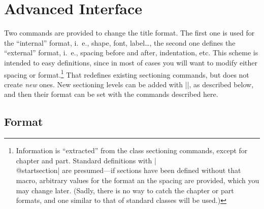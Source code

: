 \documentclass[a4paper]{ltxguide}
\def\gobble#1{}
\def\cs#1{\expandafter\gobble\string\\#1}
\begin{document}
\section{Advanced Interface}

Two commands are provided to change the title format.  The first one
is used for the ``internal'' format, i.~e., shape, font, label\dots,
the second one defines the ``external'' format, i.~e., spacing before
and after, indentation, etc.  This scheme is intended to easy
definitions, since in most of cases you will want to modify either
spacing or format.\footnote{Information is ``extracted'' from the
class sectioning commands, except for chapter and part.  Standard
definitions with |\cs{@startsection}| are presumed---if sections have
been defined without that macro, arbitrary values for the format an
the spacing are provided, which you may change later.  (Sadly, there
is no way to catch the chapter or part formats, and one similar to
that of standard classes will be used.)} That redefines existing
sectioning commands, but does not create \emph{new} ones.  New
sectioning levels can be added with |\titleclass|, as described below,
and then their format can be set with the commands described here.

\subsection{Format}
\end{document}
